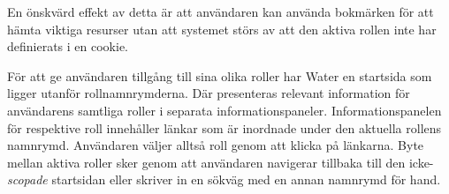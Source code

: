 En önskvärd effekt av detta är att användaren kan använda bokmärken för att hämta viktiga resurser utan att systemet störs av att den aktiva rollen inte har definierats i en cookie.

För att ge användaren tillgång till sina olika roller har Water en startsida som ligger utanför rollnamnrymderna. Där presenteras relevant information för användarens samtliga roller i separata informationspaneler. 
Informationspanelen för respektive roll innehåller länkar som är inordnade under den aktuella rollens namnrymd. Användaren väljer alltså roll genom att klicka på länkarna. Byte mellan aktiva roller sker genom att användaren navigerar tillbaka till den icke-\emph{scopade} startsidan eller skriver in en sökväg med en annan namnrymd för hand.
